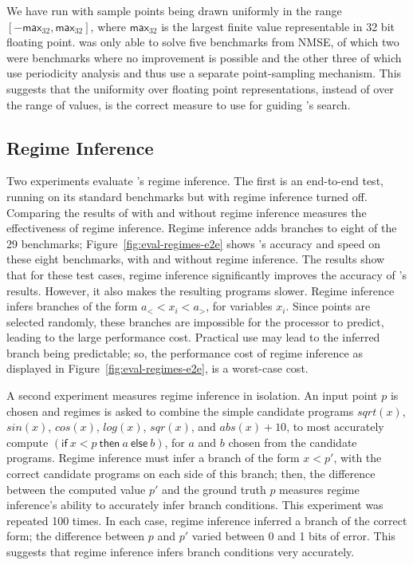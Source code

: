 \documentclass[paper.tex]{subfiles}
\begin{document}
We have run \casio with sample points being drawn uniformly in the
range $[-\mathsf{max}_{32}, \mathsf{max}_{32}]$, where $\mathsf{max}_{32}$ is the
largest finite value representable in 32 bit floating point.  \casio
was only able to solve five benchmarks from NMSE, of which two were
benchmarks where no improvement is possible and the other three of
which use periodicity analysis and thus use a separate point-sampling
mechanism.  This suggests that the uniformity over floating point
representations, instead of over the range of values, is the correct
measure to use for guiding \casio's search.

\subsection{Regime Inference} \label{sec:eval-regimes}

Two experiments evaluate \casio's regime inference.  The first is an
end-to-end test, running \casio on its standard benchmarks but with
regime inference turned off.  Comparing the results of \casio with and
without regime inference measures the effectiveness of regime
inference.  Regime inference adds branches to eight of the 29
benchmarks; Figure~\ref{fig:eval-regimes-e2e} shows \casio's accuracy
and speed on these eight benchmarks, with and without regime
inference.  The results show that for these test cases, regime
inference significantly improves the accuracy of \casio's results.
However, it also makes the resulting programs slower.  Regime
inference infers branches of the form $a_< < x_i < a_>$, for variables
$x_i$.  Since points are selected randomly, these branches are
impossible for the processor to predict, leading to the large
performance cost.  Practical use may lead to the inferred branch being
predictable; so, the performance cost of regime inference as displayed
in Figure~\ref{fig:eval-regimes-e2e}, is a worst-case cost.

A second experiment measures regime inference in isolation.  An input
point $p$ is chosen and regimes is asked to combine the simple
candidate programs $sqrt(x)$, $sin(x)$, $cos(x)$, $log(x)$, $sqr(x)$,
and $abs(x) + 10$, to most accurately compute $(\mathsf{if}\:x <
p\:\mathsf{then}\:a\:\mathsf{else}\:b)$, for $a$ and $b$ chosen from
the candidate programs.  Regime inference must infer a branch of the
form $x < p'$, with the correct candidate programs on each side of
this branch; then, the difference between the computed value $p'$ and
the ground truth $p$ measures regime inference's ability to accurately
infer branch conditions.  This experiment was repeated 100 times.  In
each case, regime inference inferred a branch of the correct form; the
difference between $p$ and $p'$ varied between 0 and 1 bits of error.
This suggests that regime inference infers branch conditions very
accurately.
\end{document}
